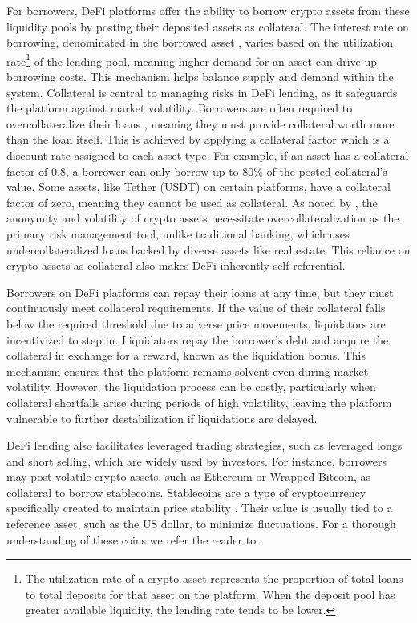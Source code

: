 \documentclass[11pt]{article} %
\begin{document}
For borrowers, DeFi platforms offer the ability to borrow crypto assets from these liquidity pools by posting their deposited assets as collateral. The interest rate on borrowing, denominated in the borrowed asset \citep{john23}, varies based on the utilization rate\footnote{The utilization rate of a crypto asset represents the proportion of total loans to total deposits for that asset on the platform. When the deposit pool has greater available liquidity, the lending rate tends to be lower.} of the lending pool, meaning higher demand for an asset can drive up borrowing costs. This mechanism helps balance supply and demand within the system. Collateral is central to managing risks in DeFi lending, as it safeguards the platform against market volatility. Borrowers are often required to overcollateralize their loans \citep{wang22}, meaning they must provide collateral worth more than the loan itself. This is achieved by applying a collateral factor which is a discount rate assigned to each asset type. For example, if an asset has a collateral factor of 0.8, a borrower can only borrow up to 80\% of the posted collateral's value. Some assets, like Tether (USDT) on certain platforms, have a collateral factor of zero, meaning they cannot be used as collateral. As noted by \cite{cornelli24}, the anonymity and volatility of crypto assets necessitate overcollateralization as the primary risk management tool, unlike traditional banking, which uses undercollateralized loans backed by diverse assets like real estate. This reliance on crypto assets as collateral also makes DeFi inherently self-referential.

Borrowers on DeFi platforms can repay their loans at any time, but they must continuously meet collateral requirements. If the value of their collateral falls below the required threshold due to adverse price movements, liquidators are incentivized to step in. Liquidators repay the borrower’s debt and acquire the collateral in exchange for a reward, known as the liquidation bonus. This mechanism ensures that the platform remains solvent even during market volatility. However, the liquidation process can be costly, particularly when collateral shortfalls arise during periods of high volatility, leaving the platform vulnerable to further destabilization if liquidations are delayed. 

DeFi lending also facilitates leveraged trading strategies, such as leveraged longs and short selling, which are widely used by investors. For instance, borrowers may post volatile crypto assets, such as Ethereum or Wrapped Bitcoin, as collateral to borrow stablecoins. Stablecoins are a type of cryptocurrency specifically created to maintain price stability \citep{clark20}. Their value is usually tied to a reference asset, such as the US dollar, to minimize fluctuations. For a thorough understanding of these coins we refer the reader to \cite{klages20}.
\end{document}
